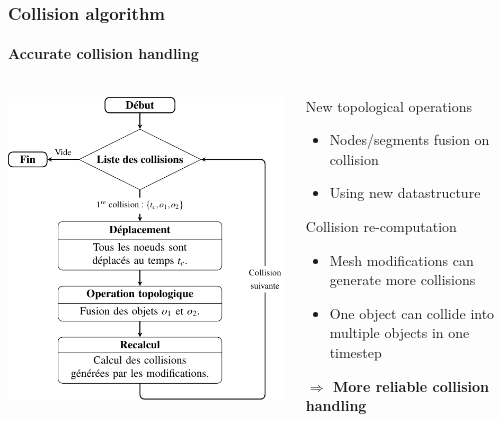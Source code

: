 \documentclass[aspectratio=1610,t,10pt]{beamer}
\newlength{\freeheight}
\begin{document}
\begin{frame}
\frametitle{Collision algorithm}
\framesubtitle{Accurate collision handling}
\begin{columns}[c]
	\begin{column}{.48\textwidth}
		\includegraphics[height=\freeheight]{img/algo-collision}
	\end{column}
	\begin{column}{.48\textwidth}
		\begin{block}{New topological operations}
			\begin{itemize}
				\item Nodes/segments fusion on collision
				\item Using new datastructure
			\end{itemize}
		\end{block}
		\begin{block}{Collision re-computation}
			\begin{itemize}
				\item Mesh modifications can generate more collisions
				\item One object can collide into multiple objects in one timestep
			\end{itemize}
		\end{block}
		\textbf{$\Rightarrow$ More reliable collision handling}
		
	\end{column}
\end{columns}
\end{frame}
\end{document}
